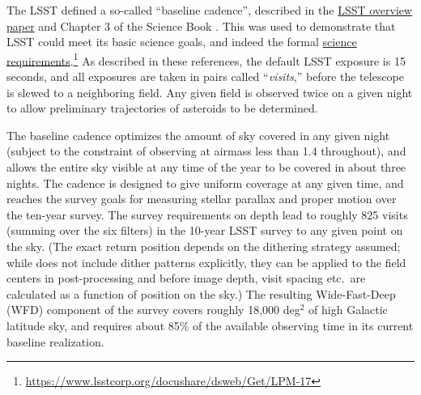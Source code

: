 The LSST defined a so-called ``baseline cadence'', described in the
\href{http://adsabs.harvard.edu/abs/2008arXiv0805.2366I}{LSST overview
paper} \citep{IvezicEtal2008} and Chapter 3 of the Science Book \citep{2009arXiv0912.0201L}.  This was used
to demonstrate that LSST could meet its basic science goals, and indeed
the formal
\href{https://www.lsstcorp.org/docushare/dsweb/Get/LPM-17}{science
requirements}.\footnote{\url{https://www.lsstcorp.org/docushare/dsweb/Get/LPM-17}}    As described in these references, the default LSST
exposure is 15 seconds, and all exposures are taken in pairs called  ``{\em visits},'' before the telescope is slewed to a neighboring field.
Any given field is observed twice on a given night to allow
preliminary trajectories of asteroids to be determined.

The baseline cadence optimizes the amount of sky covered in any given
night (subject to the constraint of observing at airmass less than 1.4
throughout), and allows the entire sky visible at any time of the year
to be covered in about three nights.  The cadence is designed to give
uniform coverage at any given time, and reaches the survey goals for
measuring stellar parallax and proper motion over the ten-year survey.
The survey requirements on depth lead to roughly 825 visits (summing
over the six filters) in the 10-year LSST survey to any given point on
the sky.  (The exact return position depends on the dithering strategy assumed; while \OpSim does not include dither patterns explicitly, they can be applied to the field centers in post-processing and before image depth, visit spacing etc.\ are calculated as a function of position on the sky.) The resulting Wide-Fast-Deep (WFD) component of the survey covers
roughly 18,000 deg$^2$ of high Galactic latitude sky, and requires about
85\% of the available observing time in its current baseline realization.

